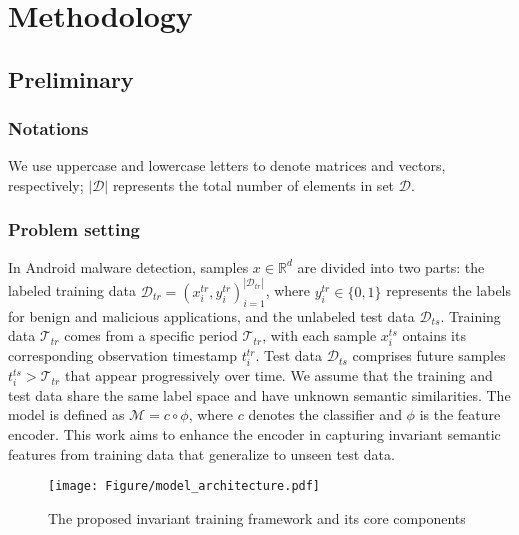 \section{Methodology}

\subsection{Preliminary}
\subsubsection{Notations}
We use uppercase and lowercase letters to denote matrices and vectors, respectively; $|\mathcal{D}|$ represents the total number of elements in set $\mathcal{D}$. 



\subsubsection{Problem setting}
In Android malware detection, samples $x \in \mathbb{R}^{d}$ are divided into two parts: the labeled training data $\mathcal{D}_{tr} = {(x_i^{tr},y_i^{tr})}^{|\mathcal{D}_{tr }|}_{i=1}$, where $y_{i}^{tr} \in \{0, 1\}$ represents the labels for benign and malicious applications, and the unlabeled test data $\mathcal{D}_{ts}$. Training data $\mathcal{T}_{tr}$ comes from a specific period $\mathcal{T}_{tr}$, with each sample $x_i^{ts}$ ontains its corresponding observation timestamp $t_i^{tr}$. Test data $\mathcal{D}_{ts}$ comprises future samples $t_i^{ts} > \mathcal{T}_{tr}$ that appear progressively over time. We assume that the training and test data share the same label space and have unknown semantic similarities. The model is defined as $\mathcal{M} = c \circ \phi$, where $c$ denotes the classifier and $\phi$ is the feature encoder. This work aims to enhance the encoder in capturing invariant semantic features from training data that generalize to unseen test data.


\begin{figure*}[htbp]
    \centering
    \texttt{[image: Figure/model\_architecture.pdf]}
    \caption{The proposed invariant training framework and its core components}
    \label{fig:model_architecture}
\end{figure*}


